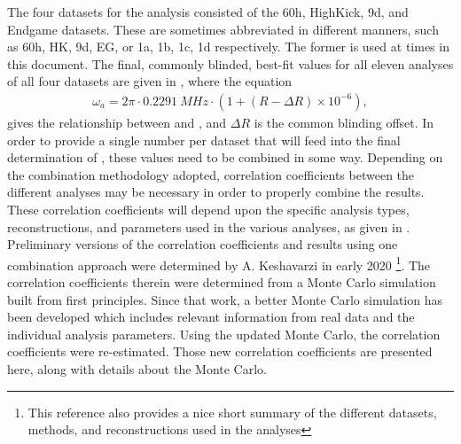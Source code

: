 The four datasets for the \Rone analysis consisted of the 60h, HighKick, 9d, and Endgame datasets. These are sometimes abbreviated in different manners, such as 60h, HK, 9d, EG, or 1a, 1b, 1c, 1d respectively. The former is used at times in this document. The final, commonly blinded, best-fit \R values for all eleven analyses of all four datasets are given in , where the equation
\begin{align}
  \omega_{a} = 2\pi \cdot \SI{0.2291}{MHz} \cdot (1 + (R - \Delta R) \times 10^{-6}),
\label{eq:wa}
\end{align}
gives the relationship between \wa and \R, and $\Delta R$ is the common blinding offset. In order to provide a single \wa number per dataset that will feed into the final determination of \amu, these \R values need to be combined in some way. Depending on the combination methodology adopted, correlation coefficients between the different analyses may be necessary in order to properly combine the results. These correlation coefficients will depend upon the specific analysis types, reconstructions, and parameters used in the various analyses, as given in . Preliminary versions of the correlation coefficients and results using one combination approach were determined by A. Keshavarzi in early 2020 \cite{AlexCombinationNote}\footnote{This reference also provides a nice short summary of the different datasets, methods, and reconstructions used in the analyses}. The correlation coefficients therein were determined from a Monte Carlo simulation built from first principles. Since that work, a better Monte Carlo simulation has been developed which includes relevant information from real data and the individual analysis parameters. Using the updated Monte Carlo, the correlation coefficients were re-estimated. Those new correlation coefficients are presented here, along with details about the Monte Carlo.


